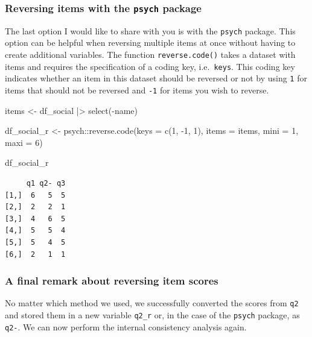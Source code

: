 \documentclass[
  letterpaper,
]{krantz}
\makeatletter
\newenvironment{Shaded}{\begin{snugshade}}{\end{snugshade}}
\newcommand{\AttributeTok}[1]{\textcolor[rgb]{0.40,0.45,0.13}{#1}}
\newcommand{\DecValTok}[1]{\textcolor[rgb]{0.68,0.00,0.00}{#1}}
\newcommand{\FunctionTok}[1]{\textcolor[rgb]{0.28,0.35,0.67}{#1}}
\newcommand{\NormalTok}[1]{\textcolor[rgb]{0.00,0.23,0.31}{#1}}
\newcommand{\OtherTok}[1]{\textcolor[rgb]{0.00,0.23,0.31}{#1}}
\newcommand{\SpecialCharTok}[1]{\textcolor[rgb]{0.37,0.37,0.37}{#1}}
\newenvironment{kframe}{%
\medskip{}
\setlength{\fboxsep}{.8em}
 \def\at@end@of@kframe{}%
 \ifinner\ifhmode%
  \def\at@end@of@kframe{\end{minipage}}%
  \begin{minipage}{\columnwidth}%
 \fi\fi%
 \def\FrameCommand##1{\hskip\@totalleftmargin \hskip-\fboxsep
 \colorbox{shadecolor}{##1}\hskip-\fboxsep
     \hskip-\linewidth \hskip-\@totalleftmargin \hskip\columnwidth}%
 \MakeFramed {\advance\hsize-\width
   \@totalleftmargin\z@ \linewidth\hsize
   \@setminipage}}%
 {\par\unskip\endMakeFramed%
 \at@end@of@kframe}
\renewenvironment{Shaded}{\begin{kframe}}{\end{kframe}}
\makeatother
\begin{document}
\subsubsection{\texorpdfstring{Reversing items with the \texttt{psych}
package}{Reversing items with the psych package}}\label{sec-reversing-items-psych}

The last option I would like to share with you is with the
\texttt{psych} package. This option can be helpful when reversing
multiple items at once without having to create additional variables.
The function \texttt{reverse.code()} takes a dataset with items and
requires the specification of a coding key, i.e.~\texttt{keys}. This
coding key indicates whether an item in this dataset should be reversed
or not by using \texttt{1} for items that should not be reversed and
\texttt{-1} for items you wish to reverse.

\begin{Shaded}
\begin{Highlighting}[]
\NormalTok{items }\OtherTok{\textless{}{-}}\NormalTok{ df\_social }\SpecialCharTok{|\textgreater{}} \FunctionTok{select}\NormalTok{(}\SpecialCharTok{{-}}\NormalTok{name)}

\NormalTok{df\_social\_r }\OtherTok{\textless{}{-}}\NormalTok{ psych}\SpecialCharTok{::}\FunctionTok{reverse.code}\NormalTok{(}\AttributeTok{keys =} \FunctionTok{c}\NormalTok{(}\DecValTok{1}\NormalTok{, }\SpecialCharTok{{-}}\DecValTok{1}\NormalTok{, }\DecValTok{1}\NormalTok{),}
                      \AttributeTok{items =}\NormalTok{ items,}
                      \AttributeTok{mini =} \DecValTok{1}\NormalTok{,}
                      \AttributeTok{maxi =} \DecValTok{6}\NormalTok{)}

\NormalTok{df\_social\_r}
\end{Highlighting}
\end{Shaded}

\begin{verbatim}
     q1 q2- q3
[1,]  6   5  5
[2,]  2   2  1
[3,]  4   6  5
[4,]  5   5  4
[5,]  5   4  5
[6,]  2   1  1
\end{verbatim}

\subsubsection{A final remark about reversing item
scores}\label{sec-reversing-items-final-remark}

No matter which method we used, we successfully converted the scores
from \texttt{q2} and stored them in a new variable \texttt{q2\_r} or, in
the case of the \texttt{psych} package, as \texttt{q2-}. We can now
perform the internal consistency analysis again.
\end{document}
